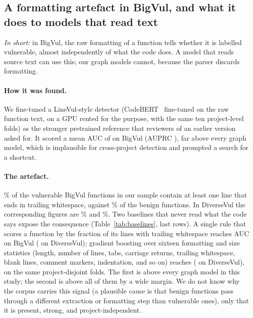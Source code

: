 \subsection{A formatting artefact in BigVul, and what it does to models that read text}
\label{sec:artefact}

\emph{In short:} in BigVul, the raw formatting of a function tells whether it is
labelled vulnerable, almost independently of what the code does. A model that
reads source text can use this; our graph models cannot, because the parser
discards formatting.

\paragraph{How it was found.} We fine-tuned a LineVul-style detector
(CodeBERT~\cite{fu2022linevul} fine-tuned on the raw function text, on a GPU
rented for the purpose, with the same ten project-level folds) as the stronger
pretrained reference that reviewers of an earlier version asked for. It scored
a mean AUC of \rBvLinevulAuc{} on BigVul (AUPRC \rBvLinevulAuprc{}), far above
every graph model, which is implausible for cross-project detection and
prompted a search for a shortcut.

\paragraph{The artefact.} \numartBvTrailVuln\% of the vulnerable BigVul functions
in our sample contain at least one line that ends in trailing whitespace,
against \numartBvTrailBenign\% of the benign functions. In DiverseVul the
corresponding figures are \numartDvTrailVuln\% and \numartDvTrailBenign\%.
Two baselines that never read what the code says expose the consequence
(Table~\ref{tab:baselines}, last rows). A single rule that scores a function by
the fraction of its lines with trailing whitespace reaches AUC \rBvTrailAuc{}
on BigVul (\rDvTrailAuc{} on DiverseVul); gradient boosting over sixteen
formatting and size statistics (length, number of lines, tabs, carriage
returns, trailing whitespace, blank lines, comment markers, indentation, and so
on) reaches \rBvFormatAuc{} (\rDvFormatAuc{} on DiverseVul), on the same
project-disjoint folds. The first is above every graph model in this study; the
second is above all of them by a wide margin. We do not know why the corpus
carries this signal (a plausible cause is that benign functions pass through a
different extraction or formatting step than vulnerable ones), only that it is
present, strong, and project-independent.


